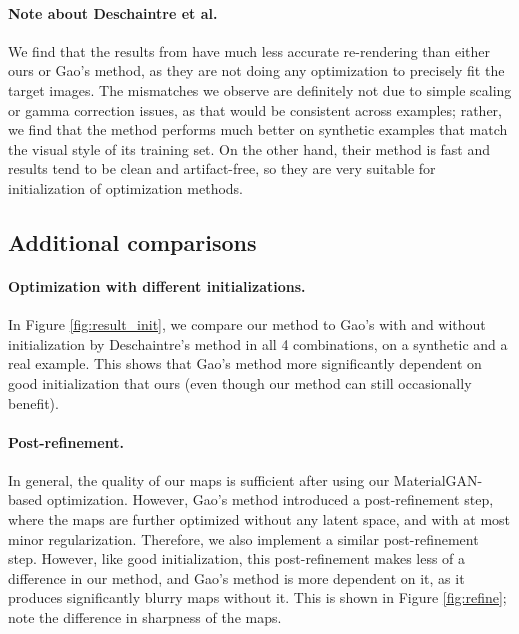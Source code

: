 \paragraph{Note about Deschaintre et al.} We find that the results from \cite{Deschaintre2019} have much less accurate re-rendering than either ours or Gao's method, as they are not doing any optimization to precisely fit the target images. The mismatches we observe are definitely not due to simple scaling or gamma correction issues, as that would be consistent across examples; rather, we find that the method performs much better on synthetic examples that match the visual style of its training set. On the other hand, their method is fast and results tend to be clean and artifact-free, so they are very suitable for initialization of optimization methods.
%
\subsection{Additional comparisons}
%

%
\paragraph{Optimization with different initializations.}
In Figure \ref{fig:result_init}, we compare our method to Gao's with and without initialization by Deschaintre's method in all 4 combinations, on a synthetic and a real example. This shows that Gao's method more significantly dependent on good initialization that ours (even though our method can still occasionally benefit).
%

%
\paragraph{Post-refinement.}
In general, the quality of our maps is sufficient after using our MaterialGAN-based optimization. However, Gao's method introduced a post-refinement step, where the maps are further optimized without any latent space, and with at most minor regularization. Therefore, we also implement a similar post-refinement step. However, like good initialization, this post-refinement makes less of a difference in our method, and Gao's method is more dependent on it, as it produces significantly blurry maps without it. This is shown in Figure \ref{fig:refine}; note the difference in sharpness of the maps.
%


%
